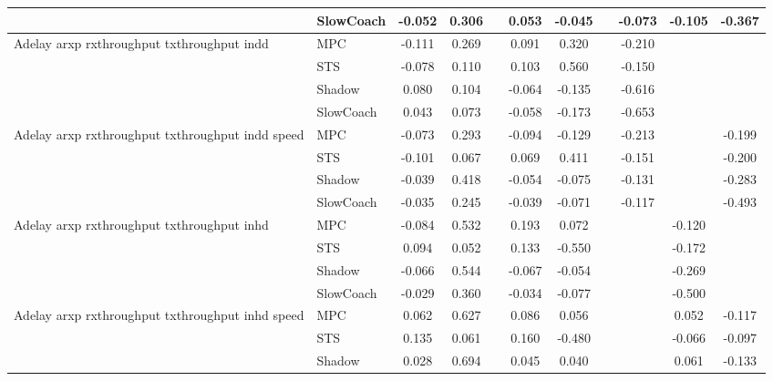\begin{tabular}{|l|l|*{9}{c|}}
                              & SlowCoach &   -0.052 &     0.306 &        &  0.053 & -0.045 &     &  -0.073 &  -0.105 &   -0.367 \\
\midrule
Adelay arxp rxthroughput txthroughput indd    & MPC &   -0.111 &     0.269 &        &  0.091 &  0.320 &     &  -0.210 &      &       \\
                              & STS &   -0.078 &     0.110 &        &  0.103 &  0.560 &     &  -0.150 &      &       \\
                              & Shadow &    0.080 &     0.104 &        & -0.064 & -0.135 &     &  -0.616 &      &       \\
                              & SlowCoach &    0.043 &     0.073 &        & -0.058 & -0.173 &     &  -0.653 &      &       \\
\midrule
Adelay arxp rxthroughput txthroughput indd speed    & MPC &   -0.073 &     0.293 &        & -0.094 & -0.129 &     &  -0.213 &      &   -0.199 \\
                              & STS &   -0.101 &     0.067 &        &  0.069 &  0.411 &     &  -0.151 &      &   -0.200 \\
                              & Shadow &   -0.039 &     0.418 &        & -0.054 & -0.075 &     &  -0.131 &      &   -0.283 \\
                              & SlowCoach &   -0.035 &     0.245 &        & -0.039 & -0.071 &     &  -0.117 &      &   -0.493 \\
\midrule
Adelay arxp rxthroughput txthroughput inhd    & MPC &   -0.084 &     0.532 &        &  0.193 &  0.072 &     &      &  -0.120 &       \\
                              & STS &    0.094 &     0.052 &        &  0.133 & -0.550 &     &      &  -0.172 &       \\
                              & Shadow &   -0.066 &     0.544 &        & -0.067 & -0.054 &     &      &  -0.269 &       \\
                              & SlowCoach &   -0.029 &     0.360 &        & -0.034 & -0.077 &     &      &  -0.500 &       \\
\midrule
Adelay arxp rxthroughput txthroughput inhd speed    & MPC &    0.062 &     0.627 &        &  0.086 &  0.056 &     &      &   0.052 &   -0.117 \\
                              & STS &    0.135 &     0.061 &        &  0.160 & -0.480 &     &      &  -0.066 &   -0.097 \\
                              & Shadow &    0.028 &     0.694 &        &  0.045 &  0.040 &     &      &   0.061 &   -0.133 \\

\end{tabular}
